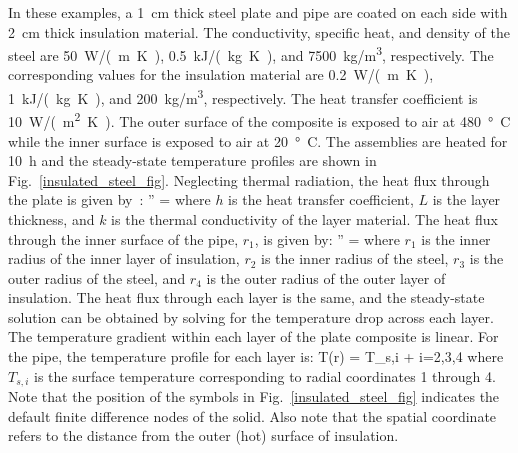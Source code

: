 \documentclass[11pt]{book}
\begin{document}
In these examples, a 1~cm thick steel plate and pipe are coated on each side with 2~cm thick insulation material. The conductivity, specific heat, and density of the steel are 50~\si{W/(m.K)}, 0.5~\si{kJ/(kg.K)}, and 7500~\si{kg/m^3}, respectively. The corresponding values for the insulation material are 0.2~\si{W/(m.K)}, 1~\si{kJ/(kg.K)}, and 200~\si{kg/m^3}, respectively. The heat transfer coefficient is 10~\si{W/(m^2.K)}. The outer surface of the composite is exposed to air at 480~\si{\degree C} while the inner surface is exposed to air at 20~\si{\degree C}. The assemblies are heated for 10~h and the steady-state temperature profiles are shown in Fig.~\ref{insulated_steel_fig}. Neglecting thermal radiation, the heat flux through the plate is given by~\cite{Incropera:1}:
\be
   '' = 
\ee
where $h$ is the heat transfer coefficient, $L$ is the layer thickness, and $k$ is the thermal conductivity of the layer material. The heat flux through the inner surface of the pipe, $r_1$, is given by:
\be
   '' = 
\ee
where $r_1$ is the inner radius of the inner layer of insulation, $r_2$ is the inner radius of the steel, $r_3$ is the outer radius of the steel, and $r_4$ is the outer radius of the outer layer of insulation. The heat flux through each layer is the same, and the steady-state solution can be obtained by solving for the temperature drop across each layer. The temperature gradient within each layer of the plate composite is linear. For the pipe, the temperature profile for each layer is:
\be
   T(r) = T_{s,i} +  \ln {} \quad \quad i=2,3,4
\ee
where $T_{s,i}$ is the surface temperature corresponding to radial coordinates 1 through 4. Note that the position of the symbols in Fig.~\ref{insulated_steel_fig} indicates the default finite difference nodes of the solid. Also note that the spatial coordinate refers to the distance from the outer (hot) surface of insulation.
\end{document}
